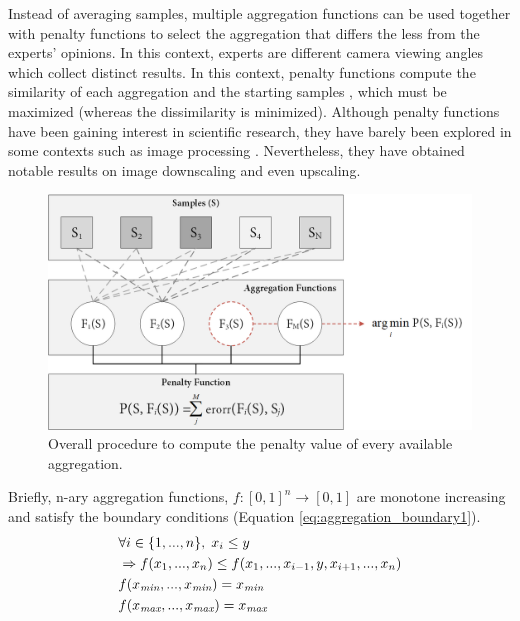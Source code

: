 Instead of averaging samples, multiple aggregation functions can be used together with penalty functions to select the aggregation that differs the less from the experts' opinions. In this context, experts are different camera viewing angles which collect distinct results. In this context, penalty functions compute the similarity of each aggregation and the starting samples \cite{bustince_definition_2017, bustince_penalty_2017}, which must be maximized (whereas the dissimilarity is minimized). Although penalty functions have been gaining interest in scientific research, they have barely been explored in some contexts such as image processing \cite{paternain_color_2012, paternain_construction_2015}. Nevertheless, they have obtained notable results on image downscaling and even upscaling.

\begin{figure}[ht]
	\includegraphics[width=\linewidth]{figs/fundamentals/penalty_functions.png}
	\caption{Overall procedure to compute the penalty value of every available aggregation.}
	\label{fig:penalty_funtions}
\end{figure}
Briefly, n-ary aggregation functions, $f: [0, 1]^n \rightarrow [0, 1]$ are monotone increasing and satisfy the boundary conditions (Equation \ref{eq:aggregation_boundary1}).  
\begin{gather}
    \begin{aligned}
        &\forall i \in \{1,...,n\}, \hspace{1mm} x_i \leq y\\
        &\Rightarrow f(x_1,...,x_n) \leq f(x_1,..., x_{i-1}, y, x_{i+1},...,x_n)\\
        &f(x_{\textit{min}},...,x_{\textit{min}}) = x_{\textit{min}}\\
        &f(x_{\textit{max}},...,x_{\textit{max}}) = x_{\textit{max}}
    \end{aligned}
    \label{eq:aggregation_boundary1}
\end{gather}

